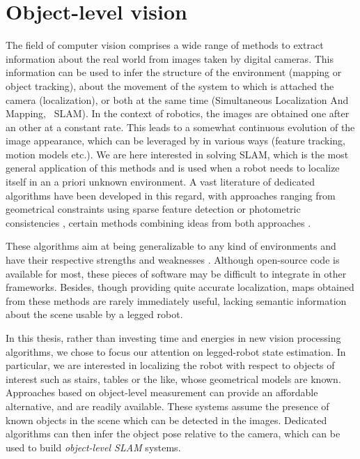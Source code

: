 \chapter{Object-level vision}
\label{chp:object_level}
\minitoc
\bigskip


The field of computer vision comprises a wide range of methods to extract information about the real world from images taken by digital cameras. 
This information can be used to infer the structure of the environment (mapping or object tracking), about the movement of the system to which is 
attached the camera (localization), or both at the same time (Simultaneous Localization And Mapping, \aka\ SLAM). In the context of robotics, the images 
are obtained one after an other at a constant rate. This leads to a somewhat continuous evolution of the image appearance, which can be leveraged by in 
various ways  (feature tracking, motion models etc.). We are here interested in solving SLAM, which is the most general application of this methods and 
is used when a robot needs to localize itself in an a priori unknown environment. A vast literature of dedicated algorithms have been developed in this 
regard, with approaches ranging from geometrical constraints using sparse feature detection \cite{mur2015orb, ferrera2021ov} or photometric consistencies 
\cite{newcombe2011dtam, engel2014lsd, engel2017direct}, certain methods combining ideas from both approaches \cite{forster2014svo, forster2016svo}.

These algorithms aim at being generalizable to any kind of environments and have their respective strengths and weaknesses \cite{fuentes2015visual}. 
Although open-source code is available for most, these pieces of software may be difficult to integrate in other frameworks. Besides, 
though providing quite accurate localization, maps obtained from these methods are rarely immediately useful, lacking semantic information about 
the scene usable by a legged robot. 

In this thesis, rather than investing time and energies in new vision processing algorithms, we chose to focus our attention on legged-robot state estimation. 
In particular, we are interested in localizing the robot with respect to objects of interest such as stairs, tables or the like, whose geometrical models are known.
Approaches based on object-level measurement can provide an affordable alternative, and are readily available. These systems assume the presence of known objects 
in the scene which can be detected in the images. Dedicated algorithms can then infer the object pose relative to the camera, which can be used to build 
\textit{object-level SLAM} systems. 

